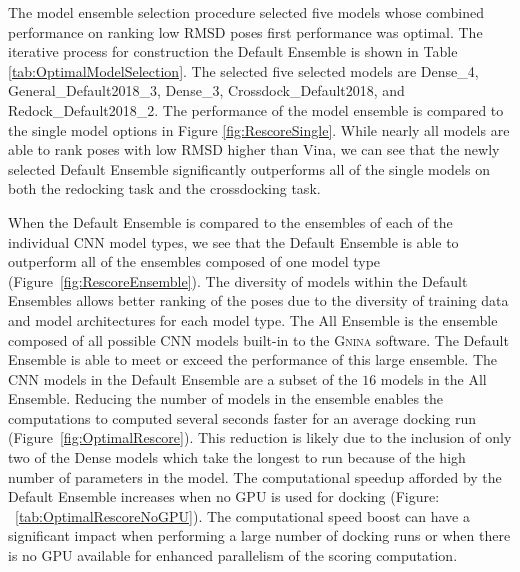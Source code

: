 \documentclass[journal=jcisd8,manuscript=article]{achemso}
\begin{document}
The model ensemble selection procedure selected five models whose combined performance on ranking low RMSD poses first performance was optimal. The iterative process for construction the Default Ensemble is shown in Table \ref{tab:OptimalModelSelection}. The selected five selected models are Dense\_4, General\_Default2018\_3, Dense\_3, Crossdock\_Default2018, and Redock\_Default2018\_2. The performance of the model ensemble is compared to the single model options in Figure \ref{fig:RescoreSingle}. While nearly all models are able to rank poses with low RMSD higher than Vina, we can see that the newly selected Default Ensemble significantly outperforms all of the single models on both the redocking task and the crossdocking task.  

When the Default Ensemble is compared to the ensembles of each of the individual CNN model types, we see that the Default Ensemble is able to outperform all of the ensembles composed of one model type (Figure~\ref{fig:RescoreEnsemble}). The diversity of models within the Default Ensembles allows better ranking of the poses due to the diversity of training data and model architectures for each model type. The All Ensemble is the ensemble composed of all possible CNN models built-in to the \textsc{Gnina} software. The Default Ensemble is able to meet or exceed the performance of this large ensemble. The CNN models in the Default Ensemble are a subset of the $16$ models in the All Ensemble. Reducing the number of models in the ensemble enables the computations to computed several seconds faster for an average docking run (Figure~\ref{fig:OptimalRescore}). This reduction is likely due to the inclusion of only two of the Dense models which take the longest to run because of the high number of parameters in the model. The computational speedup afforded by the Default Ensemble increases when no GPU is used for docking (Figure: ~\ref{tab:OptimalRescoreNoGPU}). The computational speed boost can have a significant impact when performing a large number of docking runs or when there is no GPU available for enhanced parallelism of the scoring computation.
\end{document}
